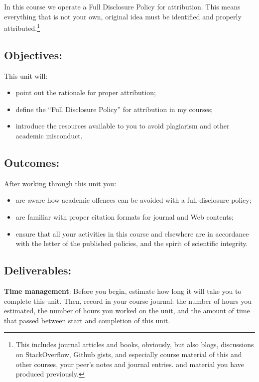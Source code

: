 \documentclass[]{book}
\providecommand{\tightlist}{%
  \setlength{\itemsep}{0pt}\setlength{\parskip}{0pt}}
\let\rmarkdownfootnote\footnote%
\def\footnote{\protect\rmarkdownfootnote}
\begin{document}
In this course we operate a Full Disclosure Policy for attribution. This
means everything that is not your own, original idea must be identified
and properly attributed.\footnote{This includes journal articles and
  books, obviously, but also blogs, discussions on StackOverflow, Github
  gists, and especially course material of this and other courses, your
  peer's notes and journal entries. and material you have produced
  previously.}

\subsection{Objectives:}\label{objectives-3}

This unit will:

\begin{itemize}
\tightlist
\item
  point out the rationale for proper attribution;
\item
  define the ``Full Disclosure Policy'' for attribution in my courses;
\item
  introduce the resources available to you to avoid plagiarism and other
  academic misconduct.
\end{itemize}

\subsection{Outcomes:}\label{outcomes-3}

After working through this unit you:

\begin{itemize}
\tightlist
\item
  are aware how academic offences can be avoided with a full-disclosure
  policy;
\item
  are familiar with proper citation formats for journal and Web
  contents;
\item
  ensure that all your activities in this course and elsewhere are in
  accordance with the letter of the published policies, and the spirit
  of scientific integrity.
\end{itemize}

\subsection{Deliverables:}\label{deliverables-3}

\textbf{Time management}: Before you begin, estimate how long it will
take you to complete this unit. Then, record in your course journal: the
number of hours you estimated, the number of hours you worked on the
unit, and the amount of time that passed between start and completion of
this unit.
\end{document}
